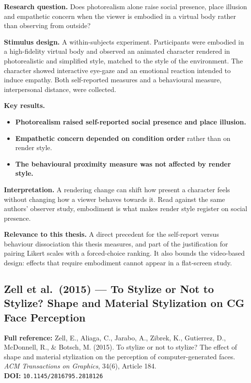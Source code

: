 \documentclass[11pt, a4paper]{article}
\begin{document}
\textbf{Research question.} Does photorealism alone raise social presence, place illusion and empathetic concern when the viewer is embodied in a virtual body rather than observing from outside?

\textbf{Stimulus design.} A within-subjects experiment. Participants were embodied in a high-fidelity virtual body and observed an animated character rendered in photorealistic and simplified style, matched to the style of the environment. The character showed interactive eye-gaze and an emotional reaction intended to induce empathy. Both self-reported measures and a behavioural measure, interpersonal distance, were collected.

\textbf{Key results.}
\begin{itemize}[leftmargin=2em]
  \item \textbf{Photorealism raised self-reported social presence and place illusion.}
  \item \textbf{Empathetic concern depended on condition order} rather than on render style.
  \item \textbf{The behavioural proximity measure was not affected by render style.}
\end{itemize}

\textbf{Interpretation.} A rendering change can shift how present a character feels without changing how a viewer behaves towards it. Read against the same authors' observer study, embodiment is what makes render style register on social presence.

\textbf{Relevance to this thesis.} A direct precedent for the self-report versus behaviour dissociation this thesis measures, and part of the justification for pairing Likert scales with a forced-choice ranking. It also bounds the video-based design: effects that require embodiment cannot appear in a flat-screen study.

\vspace{8pt}
\subsection{Zell et al.\ (2015) --- To Stylize or Not to Stylize? Shape and Material Stylization on CG Face Perception}

\begin{refbox}
\textbf{Full reference:} Zell, E., Aliaga, C., Jarabo, A., Zibrek, K., Gutierrez, D., McDonnell, R., \& Botsch, M. (2015). To stylize or not to stylize? The effect of shape and material stylization on the perception of computer-generated faces. \textit{ACM Transactions on Graphics}, 34(6), Article 184.\\[4pt]
\textbf{DOI:} \texttt{10.1145/2816795.2818126}
\end{refbox}
\end{document}
